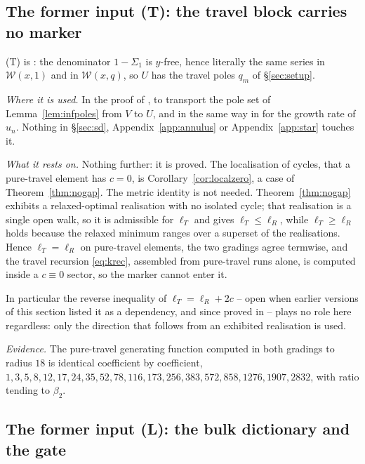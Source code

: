 \documentclass[11pt]{article}
\theoremstyle{plain}
\theoremstyle{definition}
\theoremstyle{remark}
\begin{document}
\subsection{The former input \textup{(T)}: the travel block carries no marker}\label{sec:inputT}

\textup{(T)} is {\cite[Proposition ``Invariance of the travel block'', \textup{prop:travelinv}]{Bonfioli2026bA}}: the denominator $1-\Sigma_1$ is $y$-free, hence
literally the same series in $\mathcal W(x,1)$ and in $\mathcal W(x,q)$, so $U$ has the travel
poles $q_m$ of \S\ref{sec:setup}.

\emph{Where it is used.} In the proof of {\cite[Theorem \textup{thm:U}]{Bonfioli2026bA}}, to transport the pole set of
Lemma~\ref{lem:infpoles} from $V$ to $U$, and in the same way in {\cite[Corollary \textup{cor:beta}]{Bonfioli2026bA}} for the
growth rate of $u_n$. Nothing in \S\ref{sec:sd}, Appendix~\ref{app:annulus} or
Appendix~\ref{app:star} touches it.

\emph{What it rests on.} Nothing further: it is proved. The localisation of cycles, that a
pure-travel element has $c=0$, is Corollary~\ref{cor:localzero}, a case of
Theorem~\ref{thm:nogap}. The metric identity is not needed. Theorem~\ref{thm:nogap} exhibits a
relaxed-optimal realisation with no isolated cycle; that realisation is a single open walk, so it is
admissible for $\ell_T$ and gives $\ell_T\le\ell_R$, while $\ell_T\ge\ell_R$ holds because the
relaxed minimum ranges over a superset of the realisations. Hence $\ell_T=\ell_R$ on pure-travel
elements, the two gradings agree termwise, and the travel recursion \eqref{eq:krec}, assembled from
pure-travel runs alone, is computed inside a $c\equiv0$ sector, so the marker cannot enter it.

In particular the reverse inequality of $\ell_T=\ell_R+2c$ -- open when earlier versions of this
section listed it as a dependency, and since proved in \cite{Bonfioli2026a} -- plays no role here
regardless: only the direction that follows from an exhibited realisation is used.

\emph{Evidence.} The pure-travel generating function computed in both gradings to radius $18$ is
identical coefficient by coefficient,
$1,3,5,8,12,17,24,35,52,78,116,173,256,383,572,858,1276,1907,2832$, with ratio tending to
$\beta_2$.

\subsection{The former input \textup{(L)}: the bulk dictionary and the gate}\label{sec:inputL}
\end{document}
